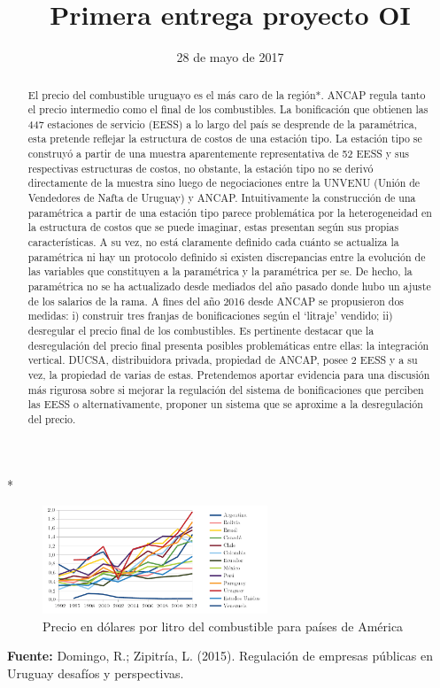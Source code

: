 \documentclass{article}
\title{Primera entrega proyecto OI}
\date{28 de mayo de 2017}
\begin{document}
\maketitle
\begin{abstract}

El precio del combustible uruguayo es el más caro de la región*. ANCAP regula tanto el precio intermedio como el final de los combustibles. La bonificación que obtienen las 447 estaciones de servicio (EESS) a lo largo del país se desprende de la paramétrica, esta pretende reflejar la estructura de costos de una estación tipo. La estación tipo se construyó a partir de una muestra aparentemente representativa de 52 EESS y sus respectivas estructuras de costos, no obstante, la estación tipo no se derivó directamente de la muestra sino luego de negociaciones entre la UNVENU (Unión de Vendedores de Nafta de Uruguay) y ANCAP. Intuitivamente la construcción de una paramétrica a partir de una estación tipo parece problemática por la heterogeneidad en la estructura de costos que se puede imaginar, estas presentan según sus propias características. A su vez, no está claramente definido cada cuánto se actualiza la paramétrica ni hay un protocolo definido si existen discrepancias entre la evolución de las variables que constituyen a la paramétrica y la paramétrica per se. De hecho, la paramétrica no se ha actualizado desde mediados del año pasado donde hubo un ajuste de los salarios de la rama. A fines del año 2016 desde ANCAP se propusieron dos medidas: i) construir tres franjas de bonificaciones según el ‘litraje’ vendido; ii) desregular el precio final de los combustibles. Es pertinente destacar que la desregulación del precio final presenta posibles problemáticas entre ellas: la integración vertical. DUCSA, distribuidora privada, propiedad de ANCAP, posee 2 EESS y a su vez, la propiedad de varias de estas. Pretendemos aportar evidencia para una discusión más rigurosa sobre si mejorar la regulación del sistema de bonificaciones que perciben las EESS o alternativamente, proponer un sistema que se aproxime a la desregulación del precio.
\end{abstract}

*\begin{figure}[H]
\caption{Precio en dólares por litro del combustible para países de América}
\includegraphics[width=0.6\textwidth]{pum.png}
\end{figure}
\FloatBarrier 
\noindent\textbf{Fuente:} Domingo, R.; Zipitría, L. (2015). Regulación de empresas públicas en Uruguay desafíos y perspectivas.\newline
\end{document}
